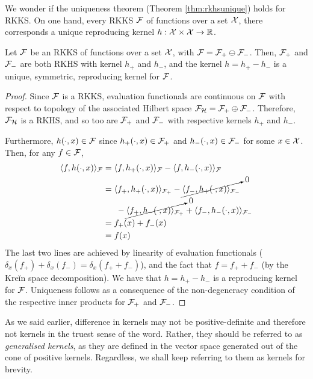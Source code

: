 We wonder if the uniqueness theorem (Theorem \ref{thm:rkhsunique}) holds for RKKS.
On one hand, every RKKS ${\mathcal F}$ of functions over a set ${\mathcal X}$, there corresponds a unique reproducing kernel $h:{\mathcal X}\times{\mathcal X}\to\mathbb{R}$.

\begin{lemma}
  Let ${\mathcal F}$ be an RKKS of functions over a set ${\mathcal X}$, with ${\mathcal F} = {\mathcal F}_+ \ominus {\mathcal F}_-$.
  Then, ${\mathcal F}_+$ and ${\mathcal F}_-$ are both RKHS with kernel $h_+$ and $h_-$, and the kernel $h = h_+ - h_-$ is a unique, symmetric, reproducing kernel for ${\mathcal F}$.  
\end{lemma}

\begin{proof}
  Since ${\mathcal F}$ is a RKKS, evaluation functionals are continuous on ${\mathcal F}$ with respect to topology of the associated Hilbert space ${\mathcal F}_{\mathcal H} = {\mathcal F}_+ \oplus {\mathcal F}_-$.
  Therefore, ${\mathcal F}_{\mathcal H}$ is a RKHS, and so too are ${\mathcal F}_+$ and ${\mathcal F}_-$ with respective kernels $h_+$ and $h_-$.
  
  Furthermore, $h(\cdot,x) \in{\mathcal F}$ since $h_+(\cdot,x) \in{\mathcal F}_+$ and $h_-(\cdot,x) \in{\mathcal F}_-$ for some $x\in{\mathcal X}$.
  Then, for any $f\in{\mathcal F}$,
  \begin{align*}
    \langle f, h(\cdot,x)\rangle_{\mathcal F} 
    &= \langle f, h_+(\cdot,x)\rangle_{{\mathcal F}} - \langle f, h_-(\cdot,x)\rangle_{{\mathcal F}} \\ 
    &= \langle f_+, h_+(\cdot,x)\rangle_{{\mathcal F}_+} - \cancelto{0}{\langle f_-, h_+(\cdot,x)\rangle_{{\mathcal F}_-}} \\
    &\phantom{==} - \cancelto{0}{\langle f_+, h_-(\cdot,x)\rangle_{{\mathcal F}_+}} + \langle f_-, h_-(\cdot,x)\rangle_{{\mathcal F}_-} \\
    &= f_+(x) + f_-(x) \\
    &= f(x)
  \end{align*}
  The last two lines are achieved by linearity of evaluation functionals ($\delta_x(f_+) + \delta_x(f_-) = \delta_x(f_+ + f_-)$), and the fact that $f = f_+ + f_-$ (by the Kreĭn space decomposition).
  We have that $h=h_+ - h_-$ is a reproducing kernel for ${\mathcal F}$.
  Uniqueness follows as a consequence of the non-degeneracy condition of the respective inner products for ${\mathcal F}_+$ and ${\mathcal F}_-$.
\end{proof}

\begin{remark}
  As we said earlier, difference in kernels may not be positive-definite and therefore not kernels in the truest sense of the word.
  Rather, they should be referred to as \emph{generalised kernels}, as they are defined in the vector space generated out of the cone of positive kernels. 
  Regardless, we shall keep referring to them as kernels for brevity.
\end{remark}

